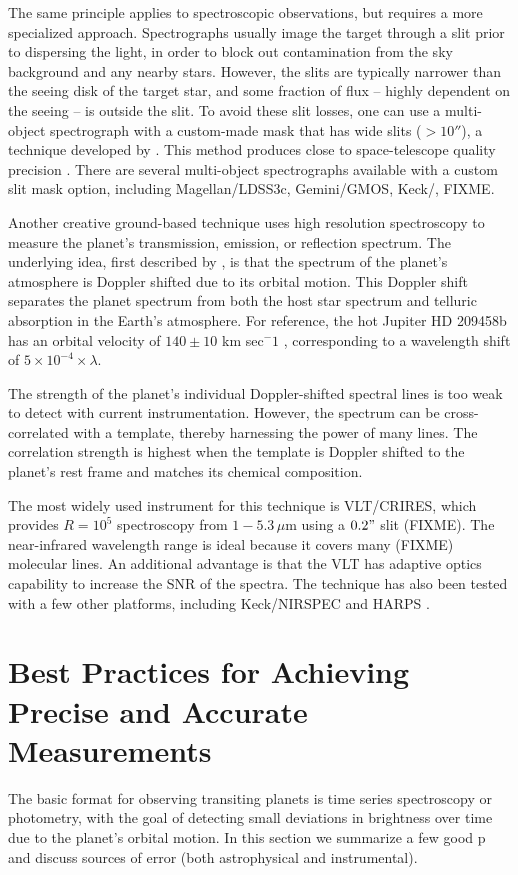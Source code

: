 \documentclass[graybox,natbib,nosecnum]{svmult}
\begin{document}
The same principle applies to spectroscopic observations, but requires a more specialized approach.  Spectrographs usually image the target through a slit prior to dispersing the light, in order to block out contamination from the sky background and any nearby stars. However, the slits are typically narrower than the seeing disk of the target star, and some fraction of flux -- highly dependent on the seeing -- is outside the slit.  To avoid these slit losses, one can use a multi-object spectrograph with a custom-made mask that has wide slits ($>10''$), a technique developed by \cite{bean10}. This method produces close to space-telescope quality precision \citep[e.g.][]{}.  There are several multi-object spectrographs available with a custom slit mask option, including Magellan/LDSS3c, Gemini/GMOS, Keck/, FIXME.  

Another creative ground-based technique uses high resolution spectroscopy to measure the planet's transmission, emission, or reflection spectrum.  The underlying idea, first described by \citep{FIXME}, is that the spectrum of the planet's atmosphere is Doppler shifted due to its orbital motion. This Doppler shift separates the planet spectrum from both the host star spectrum and telluric absorption in the Earth's atmosphere. For reference, the hot Jupiter HD 209458b has an orbital velocity of $140\pm10$ km sec$^-1$ \citep{snellen10}, corresponding to a wavelength shift of $5\times10^{-4}\times \lambda$.  

The strength of the planet's individual Doppler-shifted spectral lines is too weak to detect with current instrumentation. However, the spectrum can be cross-correlated with a template, thereby harnessing the power of many lines.  The correlation strength is highest when the template is Doppler shifted to the planet's rest frame and matches its chemical composition.

The most widely used instrument for this technique is VLT/CRIRES, which provides $R=10^5$ spectroscopy from $1-5.3\,\mu$m using a $0.2"$ slit (FIXME).  The near-infrared wavelength range is ideal because it covers many (FIXME) molecular lines. An additional advantage is that the VLT has adaptive optics capability to increase the SNR of the spectra.  The technique has also been tested with a few other platforms, including Keck/NIRSPEC and HARPS \citep{lockwood14, martins15}. 

\section{Best Practices for Achieving Precise and Accurate Measurements}
The basic format for observing transiting planets is time series spectroscopy or photometry, with the goal of detecting small deviations in brightness over time due to the planet's orbital motion.  In this section we summarize a few good p and discuss sources of error (both astrophysical and instrumental).
\end{document}
